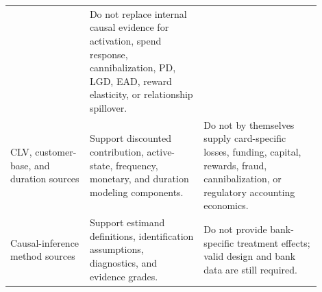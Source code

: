 \documentclass[11pt]{article}
\newcommand{\1}{\mathbf{1}}
\begin{document}
\begin{longtable}{p{0.23\linewidth}p{0.33\linewidth}p{0.34\linewidth}}
  & Do not replace internal causal evidence for activation, spend response,
    cannibalization, PD, LGD, EAD, reward elasticity, or relationship spillover. \\
CLV, customer-base, and duration sources
  & Support discounted contribution, active-state, frequency, monetary, and
    duration modeling components.
  & Do not by themselves supply card-specific losses, funding, capital,
    rewards, fraud, cannibalization, or regulatory accounting economics. \\
Causal-inference method sources
  & Support estimand definitions, identification assumptions, diagnostics, and
    evidence grades.
  & Do not provide bank-specific treatment effects; valid design and bank data
    are still required. \\
\bottomrule
\end{longtable}



\end{document}
